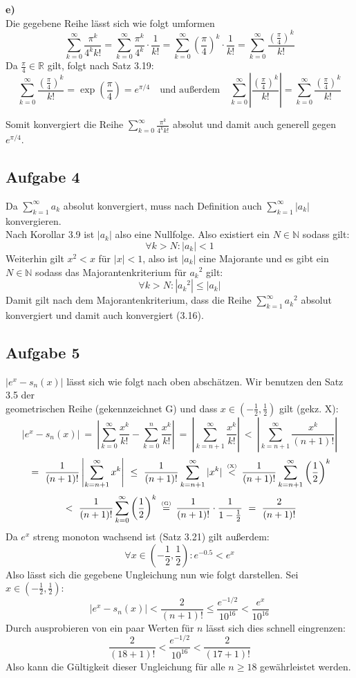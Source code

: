 \documentclass[a4paper,graphics,11pt]{article}
\newcommand{\aufgabe}[1]{\subsection*{Aufgabe #1}}
\newcommand{\up}[2]{\mathrel{\overset{\makebox[0pt]{\mbox{\normalfont\tiny #2}}}{#1}}}
\begin{document}
\textbf{e)}\\[5pt]
Die gegebene Reihe lässt sich wie folgt umformen
$$
    \sum_{k=0}^{\infty} \frac{\pi^k}{4^kk!}
    = \sum_{k=0}^{\infty} \frac{\pi^k}{4^k}\cdot \frac{1}{k!}
    = \sum_{k=0}^{\infty} \left(\frac{\pi}{4}\right)^k \cdot \frac{1}{k!}
    = \sum_{k=0}^{\infty} \frac{\left(\frac{\pi}{4}\right)^k}{k!}
$$
Da $\frac{\pi}{4} \in \mathbb{R}$ gilt, folgt nach Satz 3.19:
$$
    \sum_{k=0}^{\infty} \frac{\left(\frac{\pi}{4}\right)^k}{k!}
    = \exp\left(\frac{\pi}{4}\right)= e^{\pi/4}
    \quad\text{und außerdem}\quad
    \sum_{k=0}^{\infty} \left|\frac{\left(\frac{\pi}{4}\right)^k}{k!} \right|
    = \sum_{k=0}^{\infty}\frac{\left(\frac{\pi}{4}\right)^k}{k!} 
$$

Somit konvergiert die Reihe $\displaystyle\sum_{k=0}^{\infty} \frac{\pi^k}{4^kk!}$ absolut und
damit auch generell gegen $e^{\pi/4}$.
\newpage
\aufgabe{4}
Da $\sum_{k=1}^{\infty} a_k$ absolut konvergiert, muss nach Definition auch
$\sum_{k=1}^{\infty} |a_k|$ konvergieren.\\
Nach Korollar 3.9 ist $|a_k|$ also eine Nullfolge.
Also existiert ein $N \in \mathbb{N}$ sodass gilt:
$$
    \forall k > N \colon |a_k| < 1
$$
Weiterhin gilt $x^2 < x$ für $|x| < 1$, also ist $|a_k|$ eine Majorante und es gibt ein
$N \in \mathbb{N}$ sodass das Majorantenkriterium für ${a_k}^2$ gilt:
$$
    \forall k > N \colon |{a_k}^2| \leq |a_k|
$$
Damit gilt nach dem Majorantenkriterium, dass die Reihe $\sum_{k=1}^{\infty} {a_k}^2$
absolut konvergiert und damit auch konvergiert (3.16).
\aufgabe{5}
$|e^x - s_n(x)|$ lässt sich wie folgt 
nach oben abschätzen. Wir benutzen den Satz 3.5 der\\
geometrischen Reihe (gekennzeichnet G) und
dass $x\in \left(-\frac{1}{2},\frac{1}{2}\right)$ gilt (gekz. X):
$$
    |e^x-s_n(x)|
    \ =\ \left|\sum_{k=0}^{\infty} \frac{x^k}{k!} - \sum_{k=0}^{n} \frac{x^k}{k!}\right|
    \ =\ \left|\sum_{k=n+1}^{\infty} \frac{x^k}{k!}\right|
    \ <\ \left|\sum_{k=n+1}^{\infty} \frac{x^k}{(n+1)!}\right|
$$$$
    \ =\ \frac{1}{(n+1)!} \left|\sum_{k=n+1}^{\infty} x^k\right|
    \ \leq\ \frac{1}{(n+1)!} \sum_{k=n+1}^{\infty} |x^k|
    \up{\ <\ }{(X)}\frac{1}{(n+1)!} \sum_{k=n+1}^{\infty} \left(\frac{1}{2}\right)^k
$$$$
    \ <\ \frac{1}{(n+1)!} \sum_{k=0}^{\infty} \left(\frac{1}{2}\right)^k
    \up{\ =\ }{(G)}\frac{1}{(n+1)!}\cdot \frac{1}{1-\frac{1}{2}}
    \ =\ \frac{2}{(n+1)!}
$$
Da $e^x$ streng monoton wachsend ist (Satz 3.21) gilt außerdem:
$$
    \forall x \in \left(-\frac{1}{2}, \frac{1}{2}\right)\colon e^{-0.5} < e^{x}
$$
Also lässt sich die gegebene Ungleichung nun wie folgt darstellen. Sei $x \in \left(-\frac{1}{2}, \frac{1}{2} \right)\colon$
$$
    |e^x - s_n(x)| < \frac{2}{(n+1)!} \leq \frac{e^{-1/2}}{10^{16}} < \frac{e^x}{10^{16}}
$$
Durch ausprobieren von ein paar Werten für $n$ lässt sich dies schnell eingrenzen:
$$
    \frac{2}{(18+1)!} < \frac{e^{-1/2}}{10^{16}} < \frac{2}{(17+1)!}
$$
Also kann die Gültigkeit dieser Ungleichung für alle $n\geq 18$ gewährleistet werden.
\end{document}
